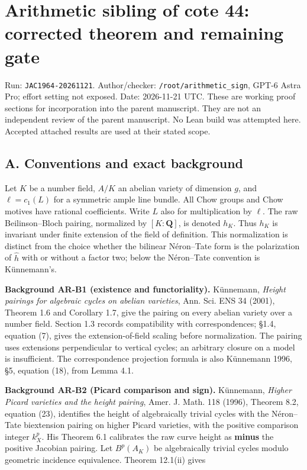 \section{Arithmetic sibling of cote 44: corrected theorem and remaining
gate}\label{arithmetic-sibling-of-cote-44-corrected-theorem-and-remaining-gate}

Run: \texttt{JAC1964-20261121}. Author/checker:
\texttt{/root/arithmetic\_sign}, GPT-6 Astra Pro; effort setting not
exposed. Date: 2026-11-21 UTC. These are working proof sections for
incorporation into the parent manuscript. They are not an independent
review of the parent manuscript. No Lean build was attempted here.
Accepted attached results are used at their stated scope.

\subsection{A. Conventions and exact
background}\label{a.-conventions-and-exact-background}

Let \(K\) be a number field, \(A/K\) an abelian variety of dimension
\(g\), and \(\ell=c_1(L)\) for a symmetric ample line bundle. All Chow
groups and Chow motives have rational coefficients. Write \(L\) also for
multiplication by \(\ell\). The raw Beilinson--Bloch pairing, normalized
by \([K:\mathbf Q]\), is denoted \(h_K\). Thus \(h_K\) is invariant
under finite extension of the field of definition. This normalization is
distinct from the choice whether the bilinear Néron--Tate form is the
polarization of \(\widehat h\) with or without a factor two; below the
Néron--Tate convention is Künnemann's.

\textbf{Background AR-B1 (existence and functoriality).} Künnemann,
\emph{Height pairings for algebraic cycles on abelian varieties}, Ann.
Sci. ENS 34 (2001), Theorem 1.6 and Corollary 1.7, give the pairing on
every abelian variety over a number field. Section 1.3 records
compatibility with correspondences; §1.4, equation (7), gives the
extension-of-field scaling before normalization. The pairing uses
extensions perpendicular to vertical cycles; an arbitrary closure on a
model is insufficient. The correspondence projection formula is also
Künnemann 1996, §5, equation (18), from Lemma 4.1.

\textbf{Background AR-B2 (Picard comparison and sign).} Künnemann,
\emph{Higher Picard varieties and the height pairing}, Amer. J. Math.
118 (1996), Theorem 8.2, equation (23), identifies the height of
algebraically trivial cycles with the Néron--Tate biextension pairing on
higher Picard varieties, with the positive comparison integer \(k_X^p\).
His Theorem 6.1 calibrates the raw curve height as \textbf{minus} the
positive Jacobian pairing. Let \(B^p(A_K)\) be algebraically trivial
cycles modulo geometric incidence equivalence. Theorem 12.1(ii) gives

